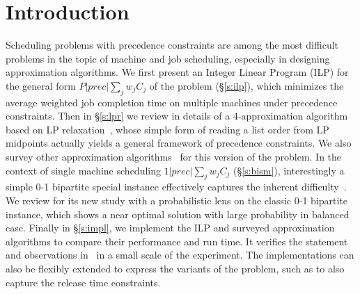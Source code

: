 \section{Introduction} \label{s:intro}
Scheduling problems with precedence constraints are among the most difficult
problems in the topic of machine and job scheduling, especially in designing
approximation algorithms. We first present an Integer Linear Program (ILP) for
the general form $P|prec|\sum_j w_jC_j$ of the problem (\S\ref{s:ilp}), which
minimizes the average weighted job completion time on multiple machines under
precedence constraints. Then in \S\ref{s:lpr} we review in details of a
4-approximation algorithm based on LP
relaxation~\cite{queyranne2006approximation}, whose simple form of reading a
list order from LP midpoints actually yields a general framework of
precedence constraints. We also survey other approximation
algorithms~\cite{chakrabarti1996improved, hoogeveen2001non} for this version of
the problem. In the context of single machine scheduling $1|prec|\sum_j w_jC_j$
(\S\ref{s:bism}), interestingly a simple 0-1 bipartite special instance
effectively captures the inherent
difficulty~\cite{woeginger2003approximability}. We review \cite{schulz2011near}
for its new study with a probabilistic lens on the classic 0-1 bipartite
instance, which shows a near optimal solution with large probability in balanced
case. Finally in \S\ref{s:impl}, we implement the ILP and surveyed approximation
algorithms to compare their performance and run time. It verifies the statement and observations in~\cite{schulz2011near} in a small scale of the experiment.
The implementations can also be flexibly extended to express the variants of the
problem, such as to also capture the release time constraints. 
